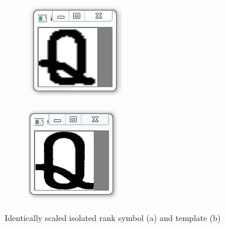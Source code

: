 \documentclass[a4paper,12pt,notitlepage]{article}
\begin{document}
			\begin{figure}[H]
				\centering
				\begin{subfigure}[b]{0.26\textwidth}
					\centering
					\includegraphics[width=\textwidth]{chris/image26}
					\caption{}
				\end{subfigure}
				\begin{subfigure}[b]{0.25\textwidth}
					\centering
					\includegraphics[width=\textwidth]{chris/image37}
					\caption{}
				\end{subfigure}
				\caption{Identically scaled isolated rank symbol (a) and template (b)}
				\label{fig:queenstruct}
			\end{figure}
\end{document}
